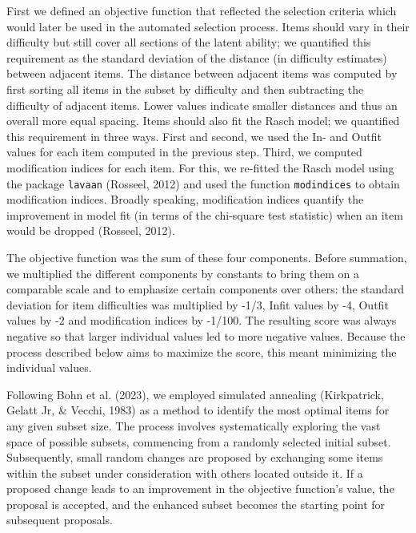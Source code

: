 \documentclass[
  man,floatsintext]{apa6}
\begin{document}
First we defined an objective function that reflected the selection criteria which would later be used in the automated selection process. Items should vary in their difficulty but still cover all sections of the latent ability; we quantified this requirement as the standard deviation of the distance (in difficulty estimates) between adjacent items. The distance between adjacent items was computed by first sorting all items in the subset by difficulty and then subtracting the difficulty of adjacent items. Lower values indicate smaller distances and thus an overall more equal spacing. Items should also fit the Rasch model; we quantified this requirement in three ways. First and second, we used the In- and Outfit values for each item computed in the previous step. Third, we computed modification indices for each item. For this, we re-fitted the Rasch model using the package \texttt{lavaan} (Rosseel, 2012) and used the function \texttt{modindices} to obtain modification indices. Broadly speaking, modification indices quantify the improvement in model fit (in terms of the chi-square test statistic) when an item would be dropped (Rosseel, 2012).

The objective function was the sum of these four components. Before summation, we multiplied the different components by constants to bring them on a comparable scale and to emphasize certain components over others: the standard deviation for item difficulties was multiplied by -1/3, Infit values by -4, Outfit values by -2 and modification indices by -1/100. The resulting score was always negative so that larger individual values led to more negative values. Because the process described below aims to maximize the score, this meant minimizing the individual values.

Following Bohn et al. (2023), we employed simulated annealing (Kirkpatrick, Gelatt Jr, \& Vecchi, 1983) as a method to identify the most optimal items for any given subset size. The process involves systematically exploring the vast space of possible subsets, commencing from a randomly selected initial subset. Subsequently, small random changes are proposed by exchanging some items within the subset under consideration with others located outside it. If a proposed change leads to an improvement in the objective function's value, the proposal is accepted, and the enhanced subset becomes the starting point for subsequent proposals.
\end{document}
